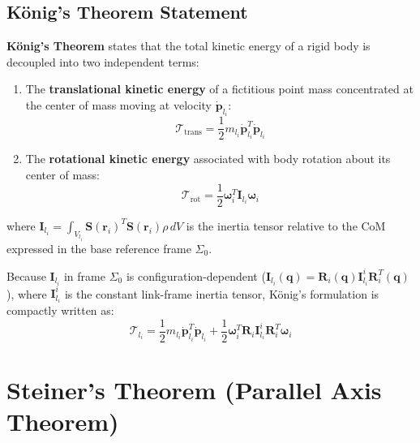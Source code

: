 \documentclass[11pt, a4paper]{article}
\begin{document}
\subsection{König's Theorem Statement}
\textbf{König's Theorem} states that the total kinetic energy of a rigid body is decoupled into two independent terms:
\begin{enumerate}
    \item The \textbf{translational kinetic energy} of a fictitious point mass concentrated at the center of mass moving at velocity $\mathbf{\dot{p}}_{l_i}$:
    \begin{equation}
        \mathcal{T}_{\text{trans}} = \frac{1}{2} m_{l_i} \mathbf{\dot{p}}_{l_i}^T \mathbf{\dot{p}}_{l_i}
    \end{equation}
    \item The \textbf{rotational kinetic energy} associated with body rotation about its center of mass:
    \begin{equation}
        \mathcal{T}_{\text{rot}} = \frac{1}{2} \boldsymbol{\omega}_i^T \mathbf{I}_{l_i} \boldsymbol{\omega}_i
    \end{equation}
\end{enumerate}
where $\mathbf{I}_{l_i} = \int_{V_{l_i}} \mathbf{S}(\mathbf{r}_i)^T \mathbf{S}(\mathbf{r}_i)\rho \, dV$ is the inertia tensor relative to the CoM expressed in the base reference frame $\Sigma_0$.

Because $\mathbf{I}_{l_i}$ in frame $\Sigma_0$ is configuration-dependent ($\mathbf{I}_{l_i}(\mathbf{q}) = \mathbf{R}_i(\mathbf{q}) \mathbf{I}_{l_i}^i \mathbf{R}_i^T(\mathbf{q})$), where $\mathbf{I}_{l_i}^i$ is the constant link-frame inertia tensor, König's formulation is compactly written as:
\begin{equation}
    \mathcal{T}_{l_i} = \frac{1}{2} m_{l_i} \mathbf{\dot{p}}_{l_i}^T \mathbf{\dot{p}}_{l_i} + \frac{1}{2} \boldsymbol{\omega}_i^T \mathbf{R}_i \mathbf{I}_{l_i}^i \mathbf{R}_i^T \boldsymbol{\omega}_i
\end{equation}

\section{Steiner's Theorem (Parallel Axis Theorem)}
\end{document}
